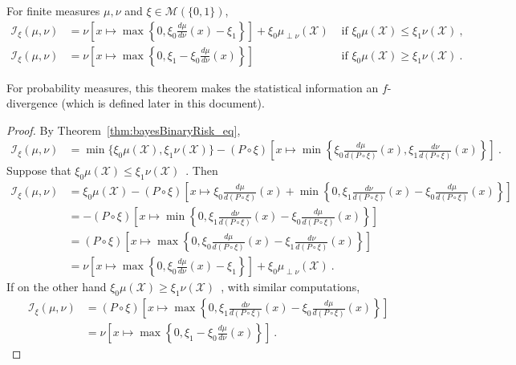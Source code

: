 \begin{theorem}
  \label{thm:statInfo_eq_integral}
  \leanok
  For finite measures $\mu, \nu$ and $\xi \in \mathcal M(\{0,1\})$,
  \begin{align*}
  \mathcal I_\xi(\mu, \nu)
  &= \nu\left[ x \mapsto \max \left\{0 , \xi_0\frac{d \mu}{d\nu}(x) - \xi_1 \right\} \right] + \xi_0 \mu_{\perp \nu}(\mathcal X) & \text{ if } \xi_0 \mu(\mathcal X) \le \xi_1 \nu(\mathcal X)
  \: , \\
  \mathcal I_\xi(\mu, \nu)
  &= \nu\left[ x \mapsto \max \left\{0 , \xi_1 - \xi_0\frac{d \mu}{d\nu}(x) \right\} \right] & \text{ if } \xi_0 \mu(\mathcal X) \ge \xi_1 \nu(\mathcal X)
  \: .
  \end{align*}
  
\end{theorem}

For probability measures, this theorem makes the statistical information an $f$-divergence (which is defined later in this document).

\begin{proof}\leanok
{}
By Theorem~\ref{thm:bayesBinaryRisk_eq},
\begin{align*}
\mathcal I_\xi(\mu, \nu)
&= \min\{\xi_0\mu(\mathcal X), \xi_1\nu(\mathcal X)\} - (P \circ \xi)\left[x \mapsto \min \left\{\xi_0\frac{d \mu}{d(P \circ \xi)}(x), \xi_1\frac{d \nu}{d(P \circ \xi)}(x)\right\}\right]
\: .
\end{align*}
Suppose that $\xi_0\mu(\mathcal X) \le \xi_1\nu(\mathcal X)$~. Then
\begin{align*}
\mathcal I_\xi(\mu, \nu)
&= \xi_0\mu(\mathcal X) - (P \circ \xi)\left[x \mapsto \xi_0\frac{d \mu}{d(P \circ \xi)}(x) + \min \left\{0 , \xi_1\frac{d \nu}{d(P \circ \xi)}(x) - \xi_0\frac{d \mu}{d(P \circ \xi)}(x)\right\}\right]
\\
&= - (P \circ \xi)\left[x \mapsto \min \left\{0 , \xi_1\frac{d \nu}{d(P \circ \xi)}(x) - \xi_0\frac{d \mu}{d(P \circ \xi)}(x) \right\}\right]
\\
&= (P \circ \xi)\left[x \mapsto \max \left\{0 , \xi_0\frac{d \mu}{d(P \circ \xi)}(x) - \xi_1\frac{d \nu}{d(P \circ \xi)}(x) \right\}\right]
\\
&= \nu\left[ x \mapsto \max \left\{0 , \xi_0\frac{d \mu}{d\nu}(x) - \xi_1 \right\} \right] + \xi_0 \mu_{\perp \nu}(\mathcal X)
\: .
\end{align*}
If on the other hand $\xi_0\mu(\mathcal X) \ge \xi_1\nu(\mathcal X)$~, with similar computations,
\begin{align*}
\mathcal I_\xi(\mu, \nu)
&= (P \circ \xi)\left[x \mapsto \max \left\{0 , \xi_1\frac{d \nu}{d(P \circ \xi)}(x) - \xi_0\frac{d \mu}{d(P \circ \xi)}(x) \right\}\right]
\\
&= \nu\left[ x \mapsto \max \left\{0 , \xi_1 - \xi_0\frac{d \mu}{d\nu}(x) \right\} \right]
\: .
\end{align*}
\end{proof}


